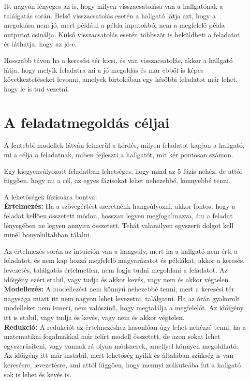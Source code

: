 \documentclass[12pt]{report}
\theoremstyle{definition}
\begin{document}
Itt nagyon lényeges az is, hogy milyen visszacsatolása van a hallgatónak a találgatás során. Belső visszacsatolás esetén a hallgató látja azt, hogy a megoldása nem jó, mert például a példa inputokból nem a megfelelő példa outputot csinálja. Külső visszacsatolás esetén többször is beküldheti a feladatot és láthatja, hogy az jó-e.

Hosszabb távon ha a keresési tér kicsi, és van visszacsatolás, akkor a hallgató látja, hogy melyik feladatra mi a jó megoldás és már ebből is képes következtetéseket levonni, amelyek birtokában egy későbbi feladatot már lehet, hogy le is tud vezetni.

\section{A feladatmegoldás céljai}
A fentebbi modellek látván felmerül a kérdés, milyen feladatot kapjon a hallgató, mi a célja a feladatnak, miben fejleszti a hallgatót, mit kér pontosan számon.

Egy kiegyensúlyozott feladatban lehetséges, hogy mind az 5 fázis nehéz, de attól függően, hogy mi a cél, az egyes fázisokat lehet nehezebbé, könnyebbé tenni.

A lehetőségek fázisokra bontva:\\

\textbf{Értelmezés:} Ha a szövegértést szeretnénk hangsúlyozni, akkor fontos, hogy a feladat kellően összetett módon, hosszan legyen megfogalmazva, ám a feladat lényegében ne legyen annyira összetett. Tehát valamilyen egyszerű dolgot kell minél bonyolultabban tálalni.

Az értelmezés során az intuíción van a hangsúly, mert ha a hallgató nem érti a feladatot, és nem kap hozzá megfelelő magyarázatot és példákat, akkor a keresés, levezetés, találgatás értelmetlen, nem fogja tudni megoldani a feladatot. Az időigény ezért stabil, vagy tudja és akkor kevés, vagy nem és akkor végtelen.\\

\textbf{Modellezés:} A modellezést nem könnyű nehezebbé tenni, mert a keresési tér nagysága miatt itt nem nagyon lehet levezetni, találgatni. Ha az órán gyakorolt modelleket nem ismeri, nem valószínű, hogy megtalálja a megfelelőt. Az időigény itt is stabil, vagy tudja és kevés, vagy nem és akkor végtelen.\\

\textbf{Redukció:} A redukciót az értelmezéshez hasonlóan úgy lehet nehézzé tenni, ha a matematikai fogalmakkal már felírt modell összetett, de azon sokat lehet egyszerűsíteni, vagy vannak rá olyan módszerek, amellyel könnyen megoldható. Az időigény itt már instabil, mert lehetőség nyílik és általában szükség is van keresésre, levezetésre, ami attól függően, hogy mennyi zsákutcába fut a hallgató sok is lehet és kevés is.\\
\end{document}
